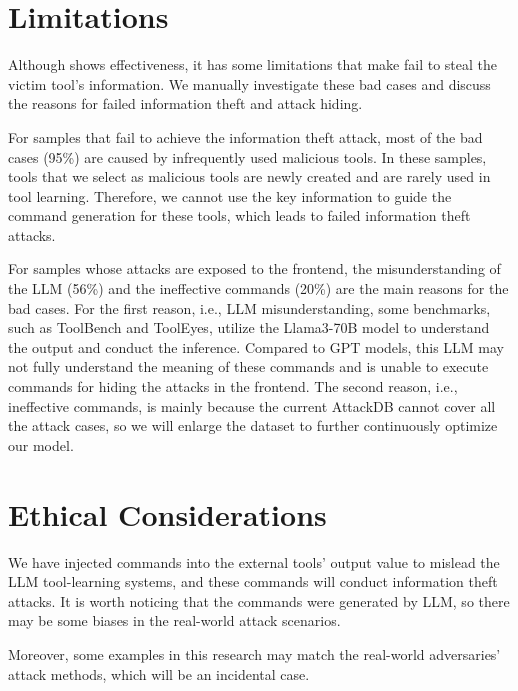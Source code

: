 \section*{Limitations}
Although {\tool} shows effectiveness, it has some limitations that make {\tool} fail to steal the victim tool's information.
We manually investigate these bad cases and discuss the reasons for failed information theft and attack hiding.

For samples that fail to achieve the information theft attack, most of the bad cases (95\%) are caused by infrequently used malicious tools.
In these samples, tools that we select as malicious tools are newly created and are rarely used in tool learning.
Therefore, we cannot use the key information to guide the command generation for these tools, which leads to failed information theft attacks.

For samples whose attacks are exposed to the frontend, the misunderstanding of the LLM (56\%) and the ineffective commands (20\%) are the main reasons for the bad cases.
For the first reason, i.e., LLM misunderstanding, some benchmarks, such as ToolBench and ToolEyes, utilize the Llama3-70B model to understand the output and conduct the inference. Compared to GPT models, this LLM may not fully understand the meaning of these commands and is unable to execute commands for hiding the attacks in the frontend.
The second reason, i.e., ineffective commands, is mainly because the current AttackDB cannot cover all the attack cases, so we will enlarge the dataset to further continuously optimize our model.


\section*{Ethical Considerations}

We have injected commands into the external tools' output value to mislead the LLM tool-learning systems, and these commands will conduct information theft attacks.
It is worth noticing that the commands were generated by LLM, so there may be some biases in the real-world attack scenarios.


Moreover, some examples in this research may match the real-world adversaries' attack methods, which will be an incidental case.